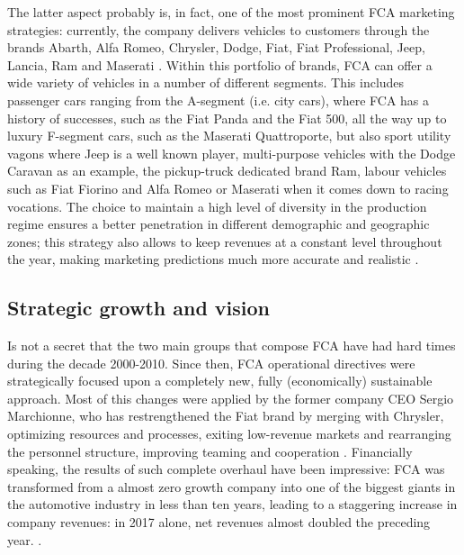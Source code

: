 The latter aspect probably is, in fact, one of the most prominent FCA marketing strategies: currently, the company delivers vehicles to customers through the brands Abarth, Alfa Romeo, Chrysler, Dodge, Fiat, Fiat Professional, Jeep, Lancia, Ram and Maserati \cite{fca_overview}. Within this portfolio of brands, FCA can offer a wide variety of vehicles in a number of different segments. This includes passenger cars ranging from the A-segment (i.e. city cars), where FCA has a history of successes, such as the Fiat Panda and the Fiat 500, all the way up to luxury F-segment cars, such as the Maserati Quattroporte, but also sport utility vagons where Jeep is a well known player, multi-purpose vehicles with the Dodge Caravan as an example, the pickup-truck dedicated brand Ram, labour vehicles such as Fiat Fiorino and Alfa Romeo or Maserati when it comes down to racing vocations.
The choice to maintain a high level of diversity in the production regime ensures a better penetration in different demographic and geographic zones; this strategy also allows to keep revenues at a constant level throughout the year, making marketing predictions much more accurate and realistic \cite{fca_marketing_strategy}.




\subsection{Strategic growth and vision}
Is not a secret that the two main groups that compose FCA have had hard times during the decade 2000-2010.
Since then, FCA operational directives were strategically focused upon a completely new, fully (economically) sustainable approach. Most of this changes were applied by the former company CEO Sergio Marchionne, who has restrengthened the Fiat brand by merging with Chrysler, optimizing resources and processes, exiting low-revenue markets and rearranging the personnel structure, improving teaming and cooperation \cite{fca_marketing_strategy}. Financially speaking, the results of such complete overhaul have been impressive: FCA was transformed from a almost zero growth company into one of the biggest giants in the automotive industry in less than ten years, leading to a staggering increase in company revenues: in 2017 alone, net revenues almost doubled the preceding year. \cite{fca_marchionne_fortune}\cite{statista_fca_net_revenues}.


